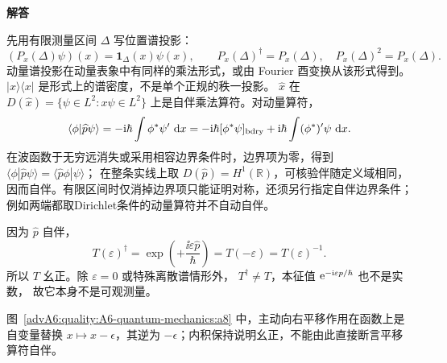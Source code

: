 \begin{advsolution}
\begin{center}\begin{minipage}{.96\linewidth}\centering
\raggedright{\bfseries\color{DeepBlue}解答}\par\smallskip\centering

\label{advA6:quality:A6-quantum-mechanics:a8}
\end{minipage}\end{center}

先用有限测量区间 $\Delta$ 写位置谱投影：
\[
 (P_x(\Delta)\psi)(x)=\mathbf1_\Delta(x)\psi(x),\qquad
 P_x(\Delta)^\dagger=P_x(\Delta),\quad P_x(\Delta)^2=P_x(\Delta).
\]
动量谱投影在动量表象中有同样的乘法形式，或由 Fourier 酉变换从该形式得到。
$|x\rangle\langle x|$ 是形式上的谱密度，不是单个正规的秩一投影。
$\widehat x$ 在 $D(\widehat x)=\{\psi\in L^2:x\psi\in L^2\}$ 上是自伴乘法算符。对动量算符，
\[
 \langle\phi|\widehat p\psi\rangle
 =-\mathrm i\hbar\int\phi^*\psi'\,\mathop{}\!\mathrm d x
 =-\mathrm i\hbar[\phi^*\psi]_{\rm bdry}
 +\mathrm i\hbar\int(\phi^*)'\psi\,\mathop{}\!\mathrm d x.
\]
在波函数于无穷远消失或采用相容边界条件时，边界项为零，得到
$\langle\phi|\widehat p\psi\rangle
=\langle\widehat p\phi|\psi\rangle$；
在整条实线上取 $D(\widehat p)=H^1(\mathbb R)$，可核验伴随定义域相同，因而自伴。有限区间时仅消掉边界项只能证明对称，还须另行指定自伴边界条件；例如两端都取Dirichlet条件的动量算符并不自动自伴。

因为 $\widehat p$ 自伴，
\[
 T(\varepsilon)^\dagger
 =\exp\!\left(+\frac{\ii\varepsilon\widehat p}{\hbar}\right)
 =T(-\varepsilon)=T(\varepsilon)^{-1}.
\]
所以 $T$ 幺正。除 $\varepsilon=0$ 或特殊离散谱情形外，
$T^\dagger\ne T$，本征值 $\mathrm e^{-\mathrm i\varepsilon p/\hbar}$ 也不是实数，
故它本身不是可观测量。

图~\ref{advA6:quality:A6-quantum-mechanics:a8} 中，主动向右平移作用在函数上是自变量替换 $x\mapsto x-\epsilon$，其逆为 $-\epsilon$；内积保持说明幺正，不能由此直接断言平移算符自伴。
\end{advsolution}

